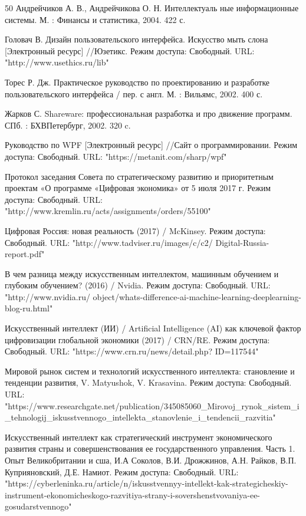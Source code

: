 \documentclass{article}
\begin{document}
\begin{thebibliography} {50}
Андрейчиков А. В., Андрейчикова О. Н. Интеллектуаль ные информационные системы. М. : Финансы и статистика, 2004. 422 с.

Головач В. Дизайн пользовательского интерфейса. Искусство мыть слона [Электронный ресурс] //Юзетикс. Режим доступа: Свободный. URL: "http://www.usethics.ru/lib"

Торес Р. Дж. Практическое руководство по проектированию и разработке пользовательского интерфейса / пер. с англ. М. : Вильямс, 2002. 400 с.

Жарков С. Shareware: профессиональная разработка и про движение программ. СПб. : БХВПетербург, 2002. 320 c.

Руководство по WPF [Электронный ресурс] //Сайт о программировании. Режим доступа: Свободный. URL: "https://metanit.com/sharp/wpf"

Протокол заседания Совета по стратегическому развитию и приоритетным проектам «О программе «Цифровая экономика» от 5 июля 2017 г. Режим доступа: Свободный. URL: "http://www.kremlin.ru/acts/assignments/orders/55100"

Цифровая Россия: новая реальность (2017) / McKinsey. Режим доступа: Свободный. URL:
"http://www.tadviser.ru/images/c/c2/ Digital-Russia-report.pdf"

В чем разница между искусственным интеллектом, машинным обучением и глубоким обучением? (2016) / Nvidia. Режим доступа: Свободный. URL: "http://www.nvidia.ru/ 
object/whats-difference-ai-machine-learning-deeplearning-blog-ru.html"

Искусственный интеллект (ИИ) / Artificial Intelligence (AI) как ключевой 
фактор цифровизации глобальной экономики (2017) / CRN/RE. Режим доступа: Свободный. URL: "https://www.crn.ru/news/detail.php? ID=117544"

Мировой рынок систем и технологий искусственного интеллекта: становление и тенденции развития, V. Matyushok, V. Krasavina. Режим доступа: Свободный. URL: 
"https://www.researchgate.net/publication/345085060_Mirovoj_rynok_sistem_i_tehnologij_iskusstvennogo_intellekta_stanovlenie_i_tendencii_razvitia"

Искусственный интеллект как стратегический инструмент экономического развития страны и совершенствования ее государственного управления. Часть 1. Опыт Великобритании и сша, И.А Соколов, В.И. Дрожжинов, А.Н. Райков, В.П. Куприяновский, Д.Е. Намиот. Режим доступа: Свободный. URL: "https://cyberleninka.ru/article/n/iskusstvennyy-intellekt-kak-strategicheskiy-instrument-ekonomicheskogo-razvitiya-strany-i-sovershenstvovaniya-ee-gosudarstvennogo"


\end{thebibliography}
\end{document}

